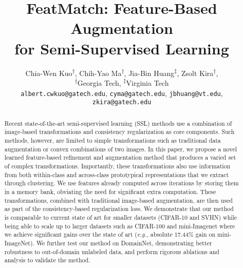 \documentclass[runningheads]{llncs}
\begin{document}
\pagestyle{headings}
\mainmatter
\def\ECCVSubNumber{3009}

\title{FeatMatch: Feature-Based Augmentation \\ for Semi-Supervised Learning}



\author{Chia-Wen Kuo\textsuperscript{$\dagger$}, Chih-Yao Ma\textsuperscript{$\dagger$}, Jia-Bin Huang\textsuperscript{$\ddagger$}, Zsolt Kira\textsuperscript{$\dagger$}, \\
\normalsize
\textsuperscript{$\dagger$}Georgia Tech,
\textsuperscript{$\ddagger$}Virginia Tech\\
\vskip 0.1in
\scriptsize
\texttt{albert.cwkuo@gatech.edu},
\texttt{cyma@gatech.edu},
\texttt{jbhuang@vt.edu},
\texttt{zkira@gatech.edu}
}

 \maketitle

\begin{abstract}
Recent state-of-the-art semi-supervised learning (SSL) methods use a combination of image-based transformations and consistency regularization as core components. Such methods, however, are limited to simple transformations such as traditional data augmentation or convex combinations of two images. In this paper, we propose a novel learned feature-based refinement and augmentation method that produces a varied set of complex transformations. Importantly, these transformations also use information from both within-class and across-class prototypical representations that we extract through clustering. We use features already computed across iterations by storing them in a memory bank, obviating the need for significant extra computation. These transformations, combined with traditional image-based augmentation, are then used as part of the consistency-based regularization loss. We demonstrate that our method is comparable to current state of art for smaller datasets (CIFAR-10 and SVHN) while being able to scale up to larger datasets such as CIFAR-100 and mini-Imagenet where we achieve significant gains over the state of art (\textit{e.g.,} absolute 17.44\% gain on mini-ImageNet). We further test our method on DomainNet, demonstrating better robustness to out-of-domain unlabeled data, and perform rigorous ablations and analysis to validate the method.

\end{abstract}
\end{document}
